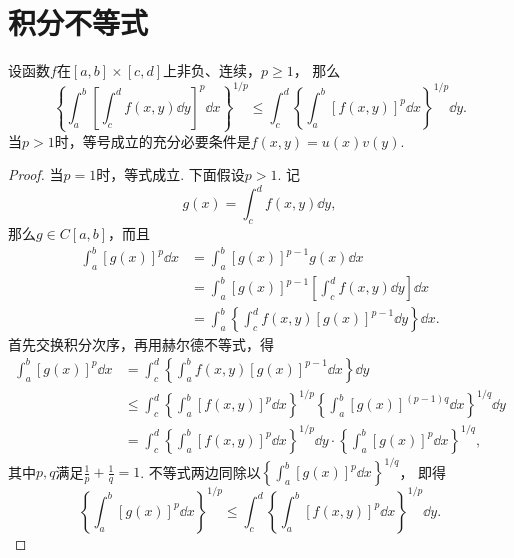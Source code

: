 \section{积分不等式}
\begin{theorem}[闵可夫斯基不等式]
设函数\(f\)在\([a,b]\times[c,d]\)上非负、连续，\(p\geq1\)，
那么\begin{equation}
	\left\{
		\int_a^b
		\left[
			\int_c^d f(x,y) \dd{y}
		\right]^p
		\dd{x}
	\right\}^{1/p}
	\leq
	\int_c^d
	\left\{
		\int_a^b
		\left[
			f(x,y)
		\right]^p
		\dd{x}
	\right\}^{1/p}
	\dd{y}.
\end{equation}
当\(p>1\)时，等号成立的充分必要条件是\(f(x,y) = u(x) v(y)\).
\begin{proof}
当\(p=1\)时，等式成立.
下面假设\(p>1\).
记\begin{equation*}
	g(x) = \int_c^d f(x,y) \dd{y},
\end{equation*}
那么\(g \in C[a,b]\)，而且\begin{align*}
	\int_a^b \left[ g(x) \right]^p \dd{x}
	&= \int_a^b \left[ g(x) \right]^{p-1} g(x) \dd{x} \\
	&= \int_a^b \left[ g(x) \right]^{p-1} \left[ \int_c^d f(x,y) \dd{y} \right] \dd{x} \\
	&= \int_a^b \left\{ \int_c^d f(x,y) \left[ g(x) \right]^{p-1} \dd{y} \right\} \dd{x}.
\end{align*}
首先交换积分次序，再用赫尔德不等式，得\begin{align*}
	\int_a^b \left[ g(x) \right]^p \dd{x}
	&= \int_c^d \left\{ \int_a^b f(x,y) \left[ g(x) \right]^{p-1} \dd{x} \right\} \dd{y} \\
	&\leq
		\int_c^d
		\left\{
			\int_a^b \left[ f(x,y) \right]^p \dd{x}
		\right\}^{1/p}
		\left\{
			\int_a^b \left[ g(x) \right]^{(p-1)q} \dd{x}
		\right\}^{1/q}
		\dd{y} \\
	&= \int_c^d
		\left\{
			\int_a^b \left[ f(x,y) \right]^p \dd{x}
		\right\}^{1/p}
		\dd{y}
		\cdot
		\left\{
			\int_a^b \left[ g(x) \right]^p \dd{x}
		\right\}^{1/q},
\end{align*}
其中\(p,q\)满足\(\frac1p+\frac1q=1\).
不等式两边同除以\(\left\{
	\int_a^b \left[ g(x) \right]^p \dd{x}
\right\}^{1/q}\)，
即得\begin{equation*}
	\left\{
		\int_a^b
		\left[
			g(x)
		\right]^p
		\dd{x}
	\right\}^{1/p}
	\leq
	\int_c^d
	\left\{
		\int_a^b
		\left[
			f(x,y)
		\right]^p
		\dd{x}
	\right\}^{1/p}
	\dd{y}.
\end{equation*}
\end{proof}
\end{theorem}
